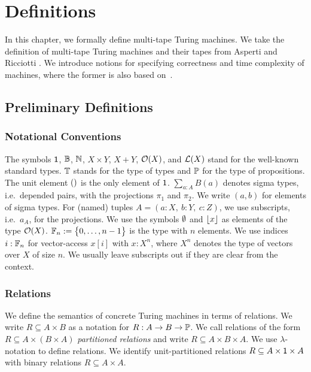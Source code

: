 \chapter{Definitions}
\label{chap:definitions}

In this chapter, we formally define multi-tape Turing machines.  We take the definition of multi-tape Turing machines and their tapes from Asperti and
Ricciotti \cite{asperti2015}.  We introduce notions for specifying correctness and time complexity of machines, where the former is also based
on~\cite{asperti2015}.

\section{Preliminary Definitions}
\label{sec:prelim}


\subsection{Notational Conventions}
\label{sec:notational-conventions}

The symbols $\mathsf{1}$, $\mathbb{B}$, $\mathbb{N}$, $X \times Y$, $X + Y$, $\mathcal{O}(X)$, and $\mathcal{L}(X)$ stand for the well-known standard types.  $\mathbb{T}$ stands for
the type of types and $\mathbb{P}$ for the type of propositions.  The unit element $\mathsf{()}$ is the only element of $\mathsf{1}$.  $\sum_{a:A} B(a)$ denotes sigma
types, i.e.\ depended pairs, with the projections $\pi_1$ and $\pi_2$.  We write $(a,b)$ for elements of sigma types.  For (named) tuples
$A = (a:X,~b:Y,~c:Z)$, we use subscripts, i.e.\ $a_A$, for the projections.  We use the symbols $\emptyset$ and $\left\lfloor {x} \right\rfloor$ as elements of the type
$\mathcal{O}(X)$.  $\mathbb{F}_n := \bigl\{ 0, \dots, n-1 \bigr \}$ is the type with $n$ elements.  We use indices $i:\mathbb{F}_n$ for vector-access $x[i]$ with $x:X^n$,
where $X^n$ denotes the type of vectors over $X$ of size $n$.  We usually leave subscripts out if they are clear from the context.


\subsection{Relations}
\label{sec:relations}

We define the semantics of concrete Turing machines in terms of relations.  We write $R \subseteq A \times B$ as a notation for
$R : A \rightarrow B \rightarrow \mathbb{P}$.  We call relations of the form $R \subseteq A \times (B \times A)$ \emph{partitioned relations} and write
$R \subseteq A \times B \times A$.  We use $\lambda$-notation to define relations.  We identify unit-partitioned relations
$R \subseteq A \times \mathsf{1} \times A$ with binary relations $R \subseteq A \times A$.


